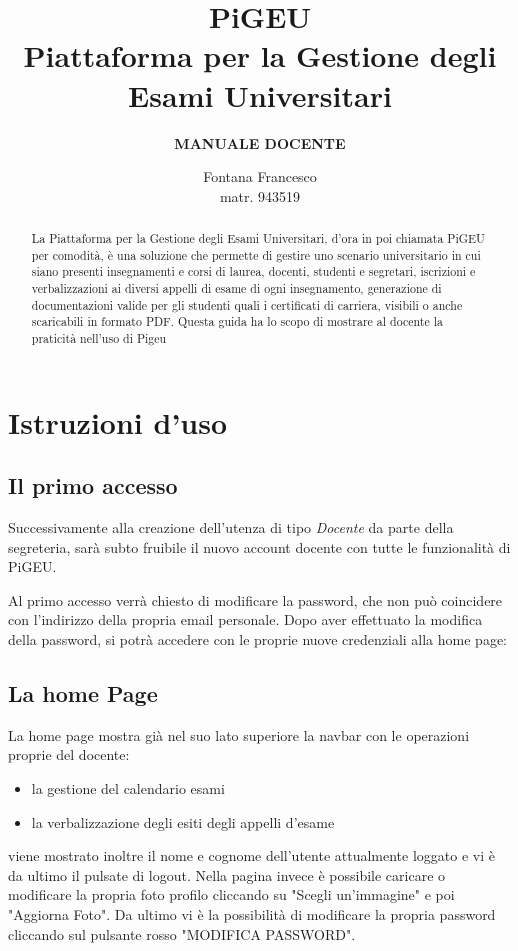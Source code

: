 \documentclass{article}
\title{PiGEU\\ Piattaforma per la Gestione degli Esami Universitari}
\author{\textbf{MANUALE DOCENTE}}
\date{Fontana Francesco \\ matr. 943519}
\begin{document}
    \maketitle

    \begin{abstract}

        La Piattaforma per la Gestione degli Esami Universitari, d'ora in poi chiamata PiGEU per comodità, è una soluzione che permette di gestire
        uno scenario universitario in cui siano presenti insegnamenti e corsi di laurea, docenti, studenti e segretari, iscrizioni e verbalizzazioni
        ai diversi appelli di esame di ogni insegnamento, generazione di documentazioni valide per gli studenti quali i certificati di carriera, visibili
        o anche scaricabili in formato PDF.
        Questa guida ha lo scopo di mostrare al docente la praticità nell'uso di Pigeu
    \end{abstract}

    \tableofcontents

    \section{Istruzioni d'uso}
    \subsection{Il primo accesso}
    Successivamente alla creazione dell'utenza di tipo \textit{Docente} da parte della segreteria, sarà subto fruibile il nuovo account docente con tutte le funzionalità di PiGEU.

    Al primo accesso verrà chiesto di modificare la password, che non può coincidere con l'indirizzo della propria email personale. Dopo aver effettuato la modifica della password, si potrà accedere con le proprie nuove credenziali alla home page:

    \subsection{La home Page}
    La home page mostra già nel suo lato superiore la navbar con le operazioni proprie del docente:
    \begin{itemize}
        \item la gestione del calendario esami
        \item la verbalizzazione degli esiti degli appelli d'esame
    \end{itemize}
    viene mostrato inoltre il nome e cognome dell'utente attualmente loggato e vi è da ultimo il pulsate di logout.
    Nella pagina invece è possibile caricare o modificare la propria foto profilo cliccando su "Scegli un'immagine" e poi "Aggiorna Foto".
    Da ultimo vi è la possibilità di modificare la propria password cliccando sul pulsante rosso "MODIFICA PASSWORD".
\end{document}
